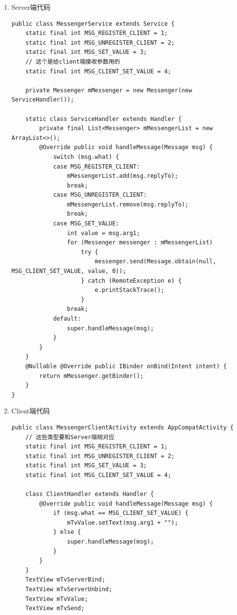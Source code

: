 \documentclass[9pt, b5paper]{article}
\begin{document}
\begin{enumerate}
\item Server端代码
\label{sec-1-6-2-1}
\begin{verbatim}
public class MessengerService extends Service {
    static final int MSG_REGISTER_CLIENT = 1;
    static final int MSG_UNREGISTER_CLIENT = 2;
    static final int MSG_SET_VALUE = 3;
    // 这个是给client端接收参数用的
    static final int MSG_CLIENT_SET_VALUE = 4;

    private Messenger mMessenger = new Messenger(new ServiceHandler());

    static class ServiceHandler extends Handler {
        private final List<Messenger> mMessengerList = new ArrayList<>();
        @Override public void handleMessage(Message msg) {
            switch (msg.what) {
            case MSG_REGISTER_CLIENT:
                mMessengerList.add(msg.replyTo);
                break;
            case MSG_UNREGISTER_CLIENT:
                mMessengerList.remove(msg.replyTo);
                break;
            case MSG_SET_VALUE:
                int value = msg.arg1;
                for (Messenger messenger : mMessengerList) 
                    try {
                        messenger.send(Message.obtain(null, MSG_CLIENT_SET_VALUE, value, 0));
                    } catch (RemoteException e) {
                        e.printStackTrace();
                    }
                break;
            default:
                super.handleMessage(msg);
            }
        }
    }
    @Nullable @Override public IBinder onBind(Intent intent) {
        return mMessenger.getBinder();
    }
}
\end{verbatim}
\item Client端代码
\label{sec-1-6-2-2}
\begin{verbatim}
public class MessengerClientActivity extends AppCompatActivity {
    // 这些类型要和Server端相对应
    static final int MSG_REGISTER_CLIENT = 1;
    static final int MSG_UNREGISTER_CLIENT = 2;
    static final int MSG_SET_VALUE = 3;
    static final int MSG_CLIENT_SET_VALUE = 4;

    class ClientHandler extends Handler {
        @Override public void handleMessage(Message msg) {
            if (msg.what == MSG_CLIENT_SET_VALUE) {
                mTvValue.setText(msg.arg1 + "");
            } else {
                super.handleMessage(msg);
            }
        }
    }
    TextView mTvServerBind;
    TextView mTvServerUnbind;
    TextView mTvValue;
    TextView mTvSend;


\end{verbatim}
\end{enumerate}
\end{document}
